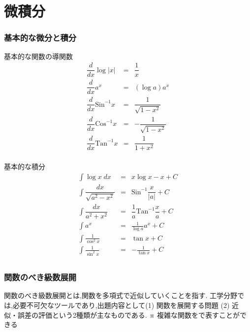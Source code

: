 \documentclass[a4paper]{jsarticle}
\begin{document}
\part{微積分}
\section{基本的な微分と積分}
\begin{itembox}[l]{基本的な関数の導関数}
    \begin{eqnarray*}
        \dfrac{d}{dx}\log |x|&=&\dfrac{1}{x}\\
        \dfrac{d}{dx}a^x&=&\left(\log a\right)a^x\\
        \dfrac{d}{dx}\mathrm{Sin}^{-1}x&=&\dfrac{1}{\sqrt{1-x^2}}\\
        \dfrac{d}{dx}\mathrm{Cos}^{-1}x&=&-\dfrac{1}{\sqrt{1-x^2}}\\
        \dfrac{d}{dx}\mathrm{Tan}^{-1}x&=&\dfrac{1}{1+x^2}\\
    \end{eqnarray*}
\end{itembox}
\begin{itembox}[l]{基本的な積分}
    \begin{eqnarray*}
        \displaystyle
        \int \log x\; dx&=&x\log x-x +C\\
        \int \dfrac{dx}{\sqrt{a^2-x^2}}&=&\mathrm{Sin}^{-1}\dfrac{x}{|a|} +C\\
        \int \dfrac{dx}{a^2+x^2}&=&\dfrac{1}{a}\mathrm{Tan}^{-1}\dfrac{x}{a} +C\\
        \int a^x&=&\frac{1}{\log a}a^x +C\\
        \int \frac{1}{\cos ^2x}&=& \tan x+C\\
        \int \frac{1}{\sin^2 x}&=& -\frac{1}{\tan x}+C\\
    \end{eqnarray*}
\end{itembox}
\section{関数のべき級数展開}
関数のべき級数展開とは,関数を多項式で近似していくことを指す.
工学分野では,必要不可欠なツールであり,出題内容として(1) 関数を展開する問題
(2) 近似・誤差の評価という2種類が主なものである.
※ 複雑な関数をで表すことができる
\end{document}
